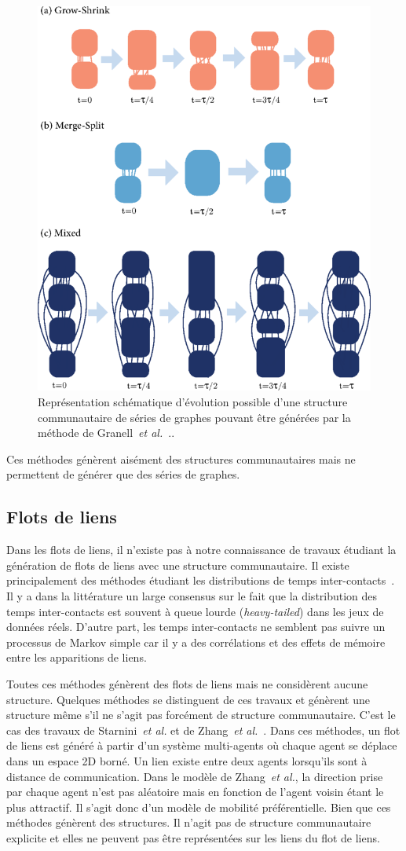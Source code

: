\begin{figure}
\centering
\includegraphics[width=0.3\linewidth]{img/Qualite/Granell.png}
\caption{Représentation schématique d'évolution possible d'une structure communautaire de séries de graphes pouvant être générées par la méthode de Granell~\emph{et al.}~\cite{Granell2015a}.\protect\footnotemark.}
\label{fig:qualite_Grannell}
\end{figure}

Ces méthodes génèrent aisément des structures communautaires mais ne permettent de générer que des séries de graphes.

\subsection{Flots de liens}

Dans les flots de liens, il n'existe pas à notre connaissance de travaux étudiant la génération de flots de liens avec une structure communautaire.
Il existe principalement des méthodes étudiant les distributions de temps inter-contacts~\cite{Malmgren2008,Malmgren2009,Vestergaard2014}.
Il y a dans la littérature un large consensus sur le fait que la distribution des temps inter-contacts est souvent à queue lourde (\emph{heavy-tailed}) dans les jeux de données réels\cite{Karsai2011,Karsai2012a,Kivela2015}.
D'autre part, les temps inter-contacts ne semblent pas suivre un processus de Markov simple car il y a des corrélations et des effets de mémoire entre les apparitions de liens.

Toutes ces méthodes génèrent des flots de liens mais ne considèrent aucune structure.
Quelques méthodes se distinguent de ces travaux et génèrent une structure même s'il ne s'agit pas forcément de structure communautaire.
C'est le cas des travaux de Starnini~\emph{et al.}\cite{Starnini2013} et de Zhang~\emph{et al.}~\cite{Zhang2015a}.
Dans ces méthodes, un flot de liens est généré à partir d'un système multi-agents où chaque agent se déplace dans un espace 2D borné.
Un lien existe entre deux agents lorsqu'ils sont à distance de communication.
Dans le modèle de Zhang~\emph{et al.}, la direction prise par chaque agent n'est pas aléatoire mais en fonction de l'agent voisin étant le plus attractif.
Il s'agit donc d'un modèle de mobilité préférentielle.
Bien que ces méthodes génèrent des structures.
Il n'agit pas de structure communautaire explicite et elles ne peuvent pas être représentées sur les liens du flot de liens.



